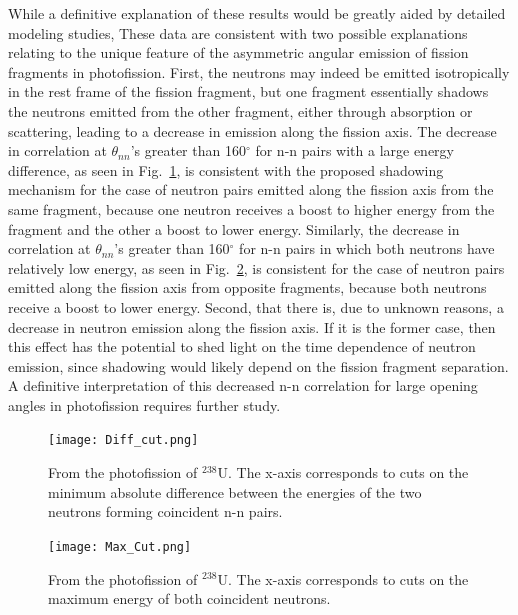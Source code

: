 While a definitive explanation of these results would be greatly aided by detailed modeling studies,
These data are consistent with two possible explanations relating to the unique feature of the asymmetric angular emission of fission fragments in photofission.
First, the neutrons may indeed be emitted isotropically in the rest frame of the fission fragment, but one fragment essentially shadows the neutrons emitted from the other fragment, either through absorption or scattering, leading to a decrease in emission along the fission axis.
The decrease in correlation at $\theta_{nn}$'s greater than 160$^{\circ}$ for n-n pairs with a large energy difference, as seen in Fig.~\ref{fig:Diff_cut}, is consistent with the proposed shadowing mechanism for the case of neutron pairs emitted along the fission axis from the same fragment, because one neutron receives a boost to higher energy from the fragment and the other a boost to lower energy.
Similarly, the decrease in correlation at $\theta_{nn}$'s greater than 160$^{\circ}$ for n-n pairs in which both neutrons have relatively low energy, as seen in Fig.~\ref{fig:Max_cut},  is consistent for the case of neutron pairs emitted along the fission axis from opposite fragments, because both neutrons receive a boost to lower energy.
Second, that there is, due to unknown reasons, a decrease in neutron emission along the fission axis.
If it is the former case, then this effect has the potential to shed light on the time dependence of neutron emission, since shadowing would likely depend on the fission fragment separation.
A definitive interpretation of this decreased n-n correlation for large opening angles in photofission requires further study.

\begin{figure}
\centering
    \texttt{[image: Diff\_cut.png]}
    \caption{From the photofission of $^{238}$U. The x-axis corresponds to cuts on the minimum absolute difference between the energies of the two neutrons forming coincident n-n pairs.}
    \label{fig:Diff_cut}
\end{figure}
\begin{figure}
\centering
    \texttt{[image: Max\_Cut.png]}
    \caption{From the photofission of $^{238}$U. The x-axis corresponds to cuts on the maximum energy of both coincident neutrons.}
    \label{fig:Max_cut}
\end{figure}

